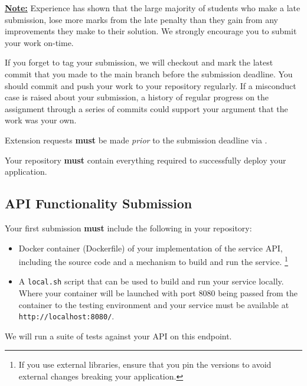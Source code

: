\documentclass{csse4400}
\begin{document}
\textbf{\underline{Note:}} Experience has shown that the large majority of students who make a late submission,
lose more marks from the late penalty than they gain from any improvements they make to their solution.
We strongly encourage you to submit your work on-time.

If you forget to tag your submission, we will checkout and mark the latest commit that you made to the main branch before the submission deadline.
You should commit and push your work to your repository regularly.
If a misconduct case is raised about your submission, a history of regular progress on the assignment through a series of commits could support your argument that the work was your own.

Extension requests \textbf{must} be made \emph{prior} to the submission deadline via .

Your repository \textbf{must} contain everything required to successfully deploy your application.

\begin{samepage}
\subsection{API Functionality Submission}
Your first submission \textbf{must} include the following in your repository:
\begin{itemize}
  \item Docker container (Dockerfile) of your implementation of the service API, including the source code and a mechanism to build and run the service.%
  \footnote{If you use external libraries, ensure that you pin the versions to avoid external changes breaking your application.}
  \item A \texttt{local.sh} script that can be used to build and run your service locally. Where your container will be launched with port 8080 being passed from the container to the testing environment and your service must be available at \texttt{http://localhost:8080/}.
\end{itemize}
We will run a suite of tests against your API on this endpoint.
\end{samepage}
\end{document}
